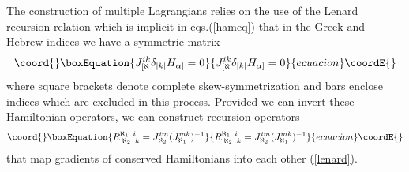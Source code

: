 \documentclass[a4paper,12pt]{article}
\begin{document}
The construction of multiple Lagrangians relies on the use of the
Lenard recursion relation which is implicit in eqs.(\ref{hameq})
that in the Greek and Hebrew indices we have a symmetric matrix
\begin{equation}\coord{}\boxEquation{
J^{ik}_{[\aleph}  \delta_{|k|} H_{\alpha]} =0 \label{lenard}
}{
J^{ik}_{[\aleph}  \delta_{|k|} H_{\alpha]} =0 }{ecuacion}\coordE{}\end{equation}
where square brackets denote complete skew-symmetrization and bars enclose
indices which are excluded in this process.
Provided we can invert these Hamiltonian operators,
we can construct recursion operators
\begin{equation}\coord{}\boxEquation{
   R_{\;\aleph_2 \; \;k}^{\aleph_1 \;\; i} = J_{\aleph_2}^{im}
   (J^{mk}_{\aleph_1})^{-1}
\label{recop}
}{
   R_{\;\aleph_2 \; \;k}^{\aleph_1 \;\; i} = J_{\aleph_2}^{im}
   (J^{mk}_{\aleph_1})^{-1}
}{ecuacion}\coordE{}\end{equation}
that map gradients of conserved Hamiltonians into each other (\ref{lenard}).
\end{document}
